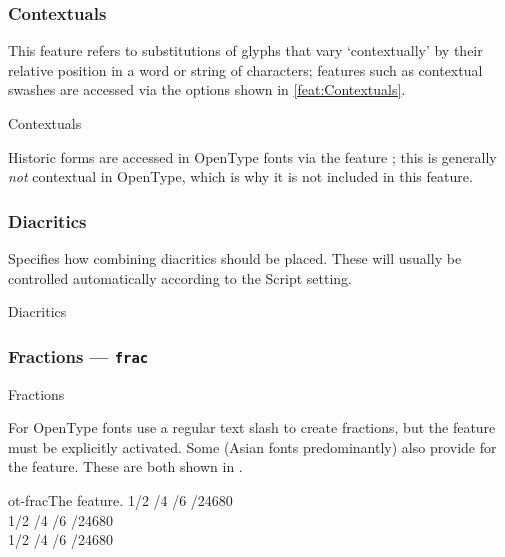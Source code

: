 \documentclass[a4paper]{l3doc}
\begin{document}
\subsubsection{Contextuals}
This feature refers to substitutions of glyphs that vary `contextually' by their relative position in a word or string of characters;
features such as contextual swashes are accessed via the options shown in \ref{feat:Contextuals}.

\begin{features}{Contextuals}
\end{features}

Historic forms are accessed in OpenType
fonts via the feature ; this is generally \emph{not}
contextual in OpenType, which is why it is not included in this feature.


\subsubsection{Diacritics}

Specifies how combining diacritics should be placed.
These will usually be controlled automatically
according to the Script setting.

\begin{features}{Diacritics}
\end{features}


\subsubsection{Fractions --- \texttt{frac}}

\begin{features}{Fractions}
\end{features}

For OpenType fonts use a regular text slash to create fractions, but
the  feature must be explicitly activated.
Some (Asian fonts predominantly) also provide for the
 feature. These are both shown in .

\begin{Xexample}{ot-frac}{The  feature.}
   1/2 /4 /6 /24680 \\
   1/2 /4 /6 /24680 \\
   1/2 /4 /6 /24680 \\
\end{Xexample}
\end{document}
